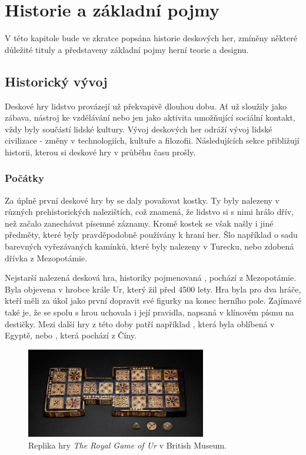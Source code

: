 \chapter{Historie a základní pojmy}
\label{chap:theory}

V této kapitole bude ve zkratce popsána historie deskových her, zmíněny některé důležité tituly a představeny základní pojmy herní teorie a designu.


\section{Historický vývoj}
\label{sec:history}

Deskové hry lidstvo provázejí už překvapivě dlouhou dobu. Ať už sloužily jako zábava, nástroj ke vzdělávání nebo jen jako aktivita umožňující sociální kontakt, vždy byly součástí lidské kultury. Vývoj deskových her odráží vývoj lidské civilizace - změny v technologiích, kultuře a filozofii. Následujících sekce přibližují historii, kterou si deskové hry v průběhu času prošly.

\subsection{Počátky}
\label{subsec:beginnings}

Za úplně první deskové hry by se daly považovat kostky. Ty byly nalezeny v různých prehistorických nalezištích, což znamená, že lidstvo si s nimi hrálo dřív, než začalo zanechávat písemné záznamy. Kromě kostek se však našly i jiné předměty, které byly pravděpodobně používány k hraní her. Šlo například o sadu barevných vyřezávaných kamínků, které byly nalezeny v Turecku, nebo zdobená dřívka z Mezopotámie. \cite{attia_2018}

Nejstarší nalezená desková hra, historiky pojmenovaná , pochází z Mezopotámie. Byla objevena v hrobce krále Ur, který žil před 4500 lety. Hra byla pro dva hráče, kteří měli za úkol jako první dopravit své figurky na konec herního pole. Zajímavé také je, že se spolu s hrou uchovala i její pravidla, napsaná v klínovém písmu na destičky. Mezi další hry z této doby patří například , která byla oblíbená v Egyptě, nebo , která pochází z Číny. \cite{british_museum_2021}

\begin{figure}[H]
    \centering
    \includegraphics[width=0.7\textwidth]{figures/theory/royal-game-of-ur-british-museum.jpg}
    \caption{Replika hry \textit{The Royal Game of Ur} v British Museum. \cite{british_museum_2021}}
    \label{fig:royal_game_of_ur}
\end{figure}

